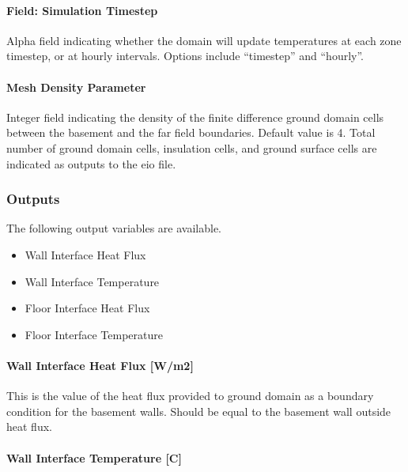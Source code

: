 \paragraph{Field: Simulation Timestep}\label{field-simulation-timestep-1}

Alpha field indicating whether the domain will update temperatures at each zone timestep, or at hourly intervals. Options include ``timestep'' and ``hourly''.

\paragraph{Mesh Density Parameter}\label{mesh-density-parameter}

Integer field indicating the density of the finite difference ground domain cells between the basement and the far field boundaries. Default value is 4. Total number of ground domain cells, insulation cells, and ground surface cells are indicated as outputs to the eio file.

\subsubsection{Outputs}\label{outputs-2-013}

The following output variables are available.

\begin{itemize}
\item
  Wall Interface Heat Flux
\item
  Wall Interface Temperature
\item
  Floor Interface Heat Flux
\item
  Floor Interface Temperature
\end{itemize}

\paragraph{Wall Interface Heat Flux {[}W/m2{]}}\label{wall-interface-heat-flux-wm2}

This is the value of the heat flux provided to ground domain as a boundary condition for the basement walls. Should be equal to the basement wall outside heat flux.

\paragraph{Wall Interface Temperature {[}C{]}}\label{wall-interface-temperature-c}

